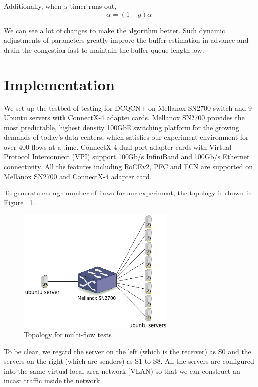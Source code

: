 \documentclass[12pt,a4paper]{article}
\begin{document}
Additionally, when $\alpha$ timer runs out,
\[\alpha=(1-g)\alpha\]

We can see a lot of changes to make the algorithm better.
Such dynamic adjustments of parameters greatly improve the buffer estimation in advance and drain the congestion fast
to maintain the buffer queue length low.

\section{Implementation}

We set up the testbed of testing for DCQCN+ on Mellanox SN2700 switch and 9 Ubuntu servers with ConnectX-4 adapter cards.
Mellanox SN2700 provides the most predictable, highest density 100GbE switching platform for the growing demands of today's data centers,
which satisfies our experiment environment for over 400 flows at a time.
ConnectX-4 dual-port adapter cards with Virtual Protocol Interconnect (VPI) support 100Gb/s InfiniBand and 100Gb/s Ethernet connectivity.
All the features including RoCEv2, PFC and ECN are supported on Mellanox SN2700 and ConnectX-4 adapter card.

To generate enough number of flows for our experiment, the topology is shown in Figure ~\ref{fig:topology}.

\begin{figure}[ht]
	\begin{center}
		\includegraphics[width=3in]{topology}
		\caption{Topology for multi-flow tests}
		\label{fig:topology}
	\end{center}
\end{figure}

To be clear, we regard the server on the left (which is the receiver) as S0 and the servers on the right (which are senders) as S1 to S8.
All the servers are configured into the same virtual local area network (VLAN) so that we can construct an incast traffic inside the network.
\end{document}
